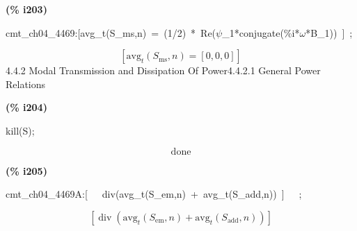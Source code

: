 \documentclass[fleqn]{article}
\begin{document}
\noindent
\begin{minipage}[t]{4.000000em}\color{red}\bfseries
(\% i203)	
\end{minipage}
\begin{minipage}[t]{\textwidth}\color{blue}
cmt\_ch04\_4469:[avg\_t(S\_ms,n)\ =\ (1/2)\ *\ Re(\ensuremath{\psi}\_1*conjugate(\%i*\ensuremath{\omega}*B\_1))\ ]\ ;
\end{minipage}
\[\displaystyle \tag{\% o203} 
\left[ {{\ensuremath{\mathrm{avg}}}_t}\left( {S_{\ensuremath{\mathrm{ms}}}}\operatorname{,}n\right) =\left[ 0\operatorname{,}0\operatorname{,}0\right] \right] \mbox{}
\]
4.4.2   Modal Transmission and Dissipation Of Power4.4.2.1 General Power Relations


\noindent
\begin{minipage}[t]{4.000000em}\color{red}\bfseries
(\% i204)	
\end{minipage}
\begin{minipage}[t]{\textwidth}\color{blue}
kill(S);
\end{minipage}
\[\displaystyle \tag{\% o204} 
\ensuremath{\mathrm{done}}\mbox{}
\]


\noindent
\begin{minipage}[t]{4.000000em}\color{red}\bfseries
(\% i205)	
\end{minipage}
\begin{minipage}[t]{\textwidth}\color{blue}
cmt\_ch04\_4469A:[\ \ \ div(avg\_t(S\_em,n)\ +\ avg\_t(S\_add,n))\ ]\ \ \ ;
\end{minipage}
\[\displaystyle \tag{\% o205} 
\left[ \operatorname{div}\left( {{\ensuremath{\mathrm{avg}}}_t}\left( {S_{\ensuremath{\mathrm{em}}}}\operatorname{,}n\right) +{{\ensuremath{\mathrm{avg}}}_t}\left( {S_{\ensuremath{\mathrm{add}}}}\operatorname{,}n\right) \right) \right] \mbox{}
\]
\end{document}
